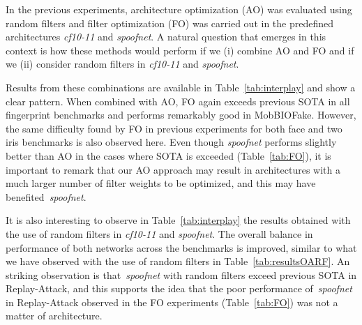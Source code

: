 In the previous experiments, architecture optimization (AO) was evaluated using random filters and filter optimization (FO) was carried out in the predefined architectures \emph{cf10-11} and \emph{spoofnet}. A natural question that emerges in this context is how these methods would perform if we (i) combine AO and FO and if we (ii) consider random filters in \emph{cf10-11} and \emph{spoofnet}.

Results from these combinations are available in Table~\ref{tab:interplay} and show a clear pattern. When combined with AO, FO again exceeds previous SOTA in all fingerprint benchmarks and performs remarkably good in MobBIOFake. However, the same difficulty found by FO in previous experiments for both face and two iris benchmarks is also observed here.
Even though \emph{spoofnet} performs slightly better than AO in the cases where SOTA is exceeded (Table~\ref{tab:FO}), it is important to remark that our AO approach may result in architectures with a much larger number of filter weights to be optimized, and this may have benefited~\emph{spoofnet}.

It is also interesting to observe in Table~\ref{tab:interplay} the results obtained with the use of random filters in \emph{cf10-11} and \emph{spoofnet}. The overall balance in performance of both networks across the benchmarks is improved, similar to what we have observed with the use of random filters in Table~\ref{tab:resultsOARF}. An striking observation is that~\emph{spoofnet} with random filters exceed previous SOTA in Replay-Attack, and this supports the idea that the poor performance of~\emph{spoofnet} in Replay-Attack observed in the FO experiments (Table~\ref{tab:FO}) was not a matter of architecture.







